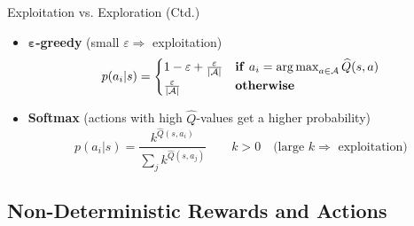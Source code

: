 \begin{frame}{Exploitation vs. Exploration (Ctd.)}{}
	\begin{itemize}
		\item $\bm{\varepsilon}$\textbf{-greedy} (small $\varepsilon \Rightarrow$ exploitation)
		\begin{equation}
			p(a_i \vert s) =
			\begin{cases}
				1 - \varepsilon + \frac{\varepsilon}{\vert \mathcal{A} \vert} & 
					\text{\textbf{if}}\ a_i = \operatorname*{arg\,max}_{a \in \mathcal{A}} \widehat{Q}(s, a) \\
				\frac{\varepsilon}{\vert \mathcal{A} \vert} &
					\text{\textbf{otherwise}}
			\end{cases}
		\end{equation}
		\item \textbf{Softmax} (actions with high $\widehat{Q}$-values get a higher probability)
		\begin{equation}
			p(a_i \vert s) = \frac{k^{\widehat{Q}(s, a_i)}}{\sum_j k^{\widehat{Q}(s, a_j)}}
			\qquad k > 0 \quad \text{(large $k \Rightarrow$ exploitation)}
		\end{equation}
	\end{itemize}
\end{frame}


\subsection{Non-Deterministic Rewards and Actions}

